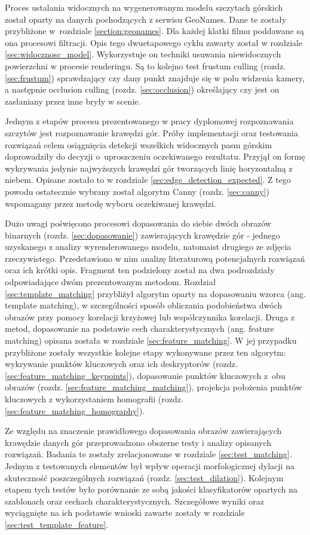 Proces ustalania widocznych na wygenerowanym modelu szczytach górskich został oparty na danych pochodzących z serwisu GeoNames. Dane te zostały przybliżone w~rozdziale \ref{section:geonames}. Dla każdej klatki filmu poddawane są ona procesowi filtracji. Opis tego dwuetapowego cyklu zawarty został w rozdziale \ref{sec:widocznosc_model}. Wykorzystuje on techniki usuwania niewidocznych powierzchni w procesie renderingu. Są to kolejno test frustum culling (rozdz. \ref{sec:frustum}) sprawdzający czy dany punkt znajduje się w polu widzenia kamery, a następnie occlusion culling (rozdz. \ref{sec:occlusion}) określający czy jest on zasłaniany przez inne bryły w scenie. 

Jednym z etapów procesu prezentowanego w pracy dyplomowej rozpoznawania szczytów jest rozpoznawanie krawędzi gór. Próby implementacji oraz testowania rozwiązań celem osiągnięcia detekcji wszelkich widocznych pasm górskim doprowadziły do decyzji o~uproszczeniu oczekiwanego rezultatu. Przyjął on formę wykrywania jedynie najwyższych krawędzi gór tworzących linię horyzontalną z niebem. Opisane zostało to w rozdziale \ref{sec:edge_detection_expected}. Z tego powodu ostatecznie wybrany został algorytm Canny (rozdz. \ref{sec:canny}) wspomagany przez metodę wyboru oczekiwanej krawędzi.

Dużo uwagi poświęcono procesowi dopasowania do siebie dwóch obrazów binarnych (rozdz. \ref{sec:dopasowanie}) zawierających krawędzie gór - jednego uzyskanego z analizy wyrenderowanego modelu, natomaist drugiego ze zdjęcia rzeczywistego. Przedstawiono w nim analizę literaturową potencjalnych rozwiązań oraz ich krótki opis. Fragment ten podzielony został na dwa podrozdziały odpowiadające dwóm prezentowanym metodom. Rozdział \ref{sec:template_matching} przybliżył algorytm oparty na dopasowaniu wzorca (ang. template matching), w szczególności sposób obliczania podobieństwa dwóch obrazów przy pomocy korelacji krzyżowej lub współczynnika korelacji. Druga z metod, dopasowanie na podstawie cech charakterystycznych (ang. feature matching) opisana została w rozdziale \ref{sec:feature_matching}. W jej przypadku przybliżone zostały wszystkie kolejne etapy wykonywane przez ten algorytm: wykrywanie punktów kluczowych oraz ich deskryptorów (rozdz. \ref{sec:feature_matching_keypoints}), dopasowanie punktów kluczowych z~obu obrazów (rozdz. \ref{sec:feature_matching_matching}), projekcja położenia punktów kluczowych z wykorzystaniem homografii (rozdz. \ref{sec:feature_matching_homography}).

Ze względu na znaczenie prawidłowego dopasowania obrazów zawierających krawędzie danych gór przeprowadzono obszerne testy i analizy opisanych rozwiązań. Badania te zostały zrelacjonowane w rozdziale \ref{sec:test_matching}. Jednym z testowanych elementów był wpływ operacji morfologicznej dylacji na skuteczność poszczególnych rozwiązań (rozdz. \ref{sec:test_dilation}). Kolejnym etapem tych testów było porównanie ze sobą jakości klasyfikatorów opartych na szablonach oraz cechach charakterystycznych. Szczegółowe wyniki oraz wyciągnięte na ich podstawie wnioski zawarte zostały w rozdziale \ref{sec:test_template_feature}.

